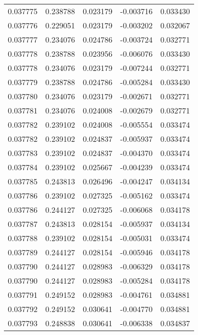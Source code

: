 \begin{tabular}{lrrrr}
0.037775    &  0.238788 &  0.023179 & -0.003716 &             0.033430 \\
0.037776    &  0.229051 &  0.023179 & -0.003202 &             0.032067 \\
0.037777    &  0.234076 &  0.024786 & -0.003724 &             0.032771 \\
0.037778    &  0.238788 &  0.023956 & -0.006076 &             0.033430 \\
0.037778    &  0.234076 &  0.023179 & -0.007244 &             0.032771 \\
0.037779    &  0.238788 &  0.024786 & -0.005284 &             0.033430 \\
0.037780    &  0.234076 &  0.023179 & -0.002671 &             0.032771 \\
0.037781    &  0.234076 &  0.024008 & -0.002679 &             0.032771 \\
0.037782    &  0.239102 &  0.024008 & -0.005554 &             0.033474 \\
0.037782    &  0.239102 &  0.024837 & -0.005937 &             0.033474 \\
0.037783    &  0.239102 &  0.024837 & -0.004370 &             0.033474 \\
0.037784    &  0.239102 &  0.025667 & -0.004239 &             0.033474 \\
0.037785    &  0.243813 &  0.026496 & -0.004247 &             0.034134 \\
0.037786    &  0.239102 &  0.027325 & -0.005162 &             0.033474 \\
0.037786    &  0.244127 &  0.027325 & -0.006068 &             0.034178 \\
0.037787    &  0.243813 &  0.028154 & -0.005937 &             0.034134 \\
0.037788    &  0.239102 &  0.028154 & -0.005031 &             0.033474 \\
0.037789    &  0.244127 &  0.028154 & -0.005946 &             0.034178 \\
0.037790    &  0.244127 &  0.028983 & -0.006329 &             0.034178 \\
0.037790    &  0.244127 &  0.028983 & -0.005284 &             0.034178 \\
0.037791    &  0.249152 &  0.028983 & -0.004761 &             0.034881 \\
0.037792    &  0.249152 &  0.030641 & -0.004770 &             0.034881 \\
0.037793    &  0.248838 &  0.030641 & -0.006338 &             0.034837 \\

\end{tabular}
